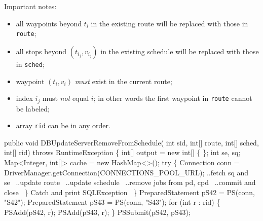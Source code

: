 \documentclass{article}
\def\nwendcode{\endtrivlist \endgroup}      %
\let\nwdocspar=\par
\theoremstyle{definition}                   %
\begin{document}
Important notes:
\begin{itemize}
\item all waypoints beyond $t_i$ in the existing route will be replaced with
those in {\tt{}route};
\item all stops beyond $(t_{i_j},v_{i_j})$ in the existing schedule will be
replaced with those in {\tt{}sched};
\item waypoint $(t_i,v_i)$ \emph{must} exist in the current route;
\item index $i_j$ must \emph{not} equal $i$; in other words the first waypoint
in {\tt{}route} cannot be labeled;
\item array {\tt{}rid} can be in any order.
\end{itemize}
\nwenddocs{}\endmoddef{}
public void DBUpdateServerRemoveFromSchedule(
    int sid, int[] route, int[] sched, int[] rid)
throws RuntimeException \{
  int[] output = new int[] \{ \};
  int se, sq;
  Map<Integer, int[]> cache = new HashMap<>();
  try \{
    Connection conn = DriverManager.getConnection(CONNECTIONS_POOL_URL);
    \LA{}..fetch \code{}sq\edoc{} and \code{}se\edoc{}~{\nwtagstyle{}}\RA{}
    \LA{}..update route~{\nwtagstyle{}}\RA{}
    \LA{}..update schedule~{\nwtagstyle{}}\RA{}
    \LA{}..remove jobs from pd, cpd~{\nwtagstyle{}}\RA{}
    \LA{}..commit and close~{\nwtagstyle{}}\RA{}
  \}
  \LA{}Catch and print \code{}SQLException\edoc{}~{\nwtagstyle{}}\RA{}
\}
\eatline
{}\nwendcode{}\endmoddef{}
PreparedStatement pS42 = PS(conn, "S42");
PreparedStatement pS43 = PS(conn, "S43");
for (int r : rid) \{
  PSAdd(pS42, r);
  PSAdd(pS43, r);
\}
PSSubmit(pS42, pS43);
\nwendcode{}\nwdocspar
\end{document}
